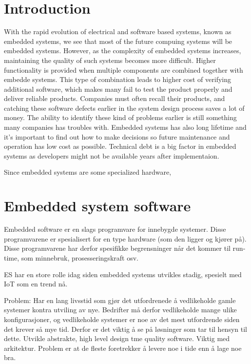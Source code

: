 \section{Introduction}
With the rapid evolution of electrical and software based systems, known as embedded systems, we see that most of the future compuing systems will be embedded systems\cite{wolfmadsen-2000}. However, as the complexity of embedded systems increases, maintaining the quality of such systems becomes more difficult. Higher functionality is provided when multiple components are combined together with embedde systems. This type of combination leads to higher cost of verifying additional software, which makes many fail to test the product properly and deliver reliable products. Companies must often recall their products, and catching these software defects earlier in the system design process saves a lot of money. The ability to identify these kind of problems earlier is still something many companies has troubles with. Embedded systems has also long lifetime and it's important to find out how to make decisions so future maintenance and operation has low cost as possible. Technical debt is a big factor in embedded systems as developers might not be available years after implementaion. 

Since embedded systems are some specialized hardware,


\section{Embedded system software}


Embedded software er en slags programvare for innebygde systemer. Disse programvarene er spesialisert for en type hardware (som den ligger og kjører på). Disse programvarene har derfor spesifikke begrensninger når det kommer til run-time, som minnebruk, prosesseringskraft osv.

ES har en store rolle idag siden embedded systems utvikles stadig, spesielt med IoT som en trend nå.

Problem: Har en lang livsstid som gjør det utfordrenede å vedlikeholde gamle systemer kontra utviling av nye. Bedrifter må derfor vedlikeholde mange ulike konfigurasjoner, og vedlikeholde systemer er noe av det mest utfordrende siden det krever så mye tid. Derfor er det viktig å se på løsninger som tar til hensyn til dette. Utvikle abstrakte, high level design tme quality software. Viktig med arkitektur. Problem er at de fleste foretrekker å levere noe i tide enn å lage noe bra.

